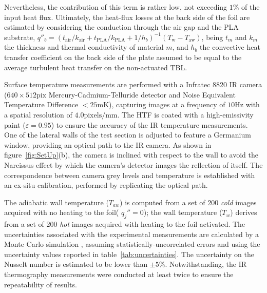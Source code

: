 Nevertheless, the contribution of this term is rather low, not exceeding $1\%$ of the input heat flux. Ultimately, the heat-flux losses at the back side of the foil are estimated by considering the conduction through the air gap and the PLA substrate, $q''_{b} = \left(t_{\mathrm{air}}/k_{\mathrm{air}}+t_{\mathrm{PLA}}/k_{\mathrm{PLA}}+1/h_b\right)^{-1}(T_\mathrm{w}-T_\mathrm{aw})$, being $t_m$ and $k_m$ the thickness and thermal conductivity of material $m$, and $h_b$ the convective heat transfer coefficient on the back side of the plate assumed to be equal to the average turbulent heat transfer on the non-actuated TBL.

Surface temperature measurements are performed with a Infratec 8820 IR camera ($640 \times 512\mathrm{pix}$ Mercury-Cadmium-Telluride detector and Noise Equivalent Temperature Difference $< 25\mathrm{mK}$), capturing images at a frequency of $10\mathrm{Hz}$ with a spatial resolution of $4.0\mathrm{pixels/mm}$. The HTF is coated with a high-emissivity paint ($\varepsilon = 0.95$) to ensure the accuracy of the IR temperature measurements. One of the lateral walls of the test section is adjusted to feature a Germanium window, providing an optical path to the IR camera. As shown in figure~\ref{fig:SetUp}(b), the camera is inclined with respect to the wall to avoid the Narcissus effect by which the camera's detector images the reflection of itself. The correspondence between camera grey levels and temperature is established with an ex-situ calibration, performed by replicating the optical path.

The adiabatic wall temperature ($T_{aw}$) is computed from a set of $200$ \textit{cold} images acquired with no heating to the foil( $q_j''= 0$); the wall temperature ($T_{w}$) derives from a set of $200$ \textit{hot} images acquired with heating to the foil activated. The uncertainties associated with the experimental measurements are calculated by a Monte Carlo simulation \citep{minkina2009infrared}, assuming statistically-uncorrelated errors and using the uncertainty values reported in table~\ref{tab:uncertainties}.
The uncertainty on the Nusselt number is estimated to be lower than $\pm 5\%$. Notwithstanding, the IR thermography measurements were conducted at least twice to ensure the repeatability of results.

